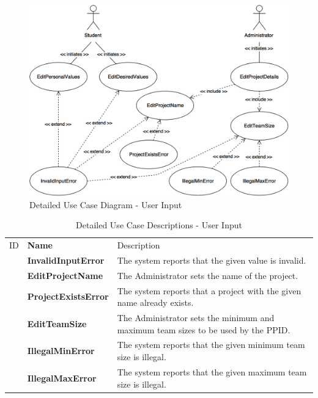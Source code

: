 \documentclass[12pt,letterpaper]{article}
\begin{document}
\begin{figure}[H]
	\centering{}
	\includegraphics[scale=0.3]{imgs/detailed-user-input-use-case-diagram.png}
	\caption{Detailed Use Case Diagram - User Input}
\end{figure}

\begin{table}[H]
	\caption{Detailed Use Case Descriptions - User Input}
	\begin{tabu} to 
	    \tableheader{}ID & Name & Description\\
		\invalidinputerror{} & InvalidInputError & The system reports that the given value is invalid.\\
		\editprojectname{} & EditProjectName & The Administrator sets the name of the project. \\
		\projectexistserror{} & ProjectExistsError & The system reports that a project with the given name already exists.\\
		\editteamsize{} & EditTeamSize & The Administrator sets the minimum and maximum team sizes to be used by the PPID. \\
		\illegalminerror{} & IllegalMinError & The system reports that the given minimum team size is illegal.\\
		\illegalmaxerror{} & IllegalMaxError & The system reports that the given maximum team size is illegal.\\
	\end{tabu}
\end{table}
\end{document}
